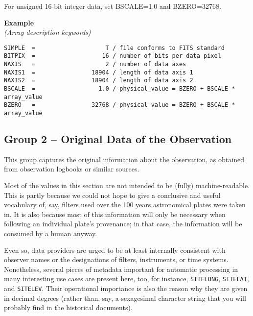 \documentclass[11pt]{ivoa}
\newcommand\cardname[1]{\texttt{\color{keyword}#1}}
\newenvironment{fitsexample}[1]
{\bigskip\noindent\textbf{Example}\\\textit{(#1)\smallskip}}
{\medskip}
\begin{document}
For unsigned 16-bit integer data, set BSCALE=1.0 and BZERO=32768.

\begin{fitsexample}{Array description keywords}
\begin{lstlisting}
SIMPLE  =                    T / file conforms to FITS standard
BITPIX  =                   16 / number of bits per data pixel
NAXIS   =                    2 / number of data axes
NAXIS1  =                18904 / length of data axis 1
NAXIS2  =                18904 / length of data axis 2
BSCALE  =                  1.0 / physical_value = BZERO + BSCALE * array_value
BZERO   =                32768 / physical_value = BZERO + BSCALE * array_value
\end{lstlisting}
\end{fitsexample}

\subsection{Group 2 -- Original Data of the Observation}

This group captures the original information about
the observation, as obtained from observation logbooks or similar
sources.

Most of the values in this section are not intended to be (fully)
machine-readable.  This is partly because we could not hope to give a
conclusive and useful vocabulary of, say, filters used over the 100 years
astronomical plates were taken in.  It is also because most of
this information will only be necessary when following an individual
plate's provenance; in that case, the information will be consumed by a
human anyway.

Even so, data providers are urged to be at least internally consistent
with observer names or the designations of filters, instruments, or time
systems.  Nonetheless, several pieces of metadata important for automatic
processing in many interesting use cases are present here, too, for
instance, \cardname{SITELONG}, \cardname{SITELAT}, and
\cardname{SITELEV}.  Their operational importance is also
the reason why they are given in decimal degrees (rather than, say, a
sexagesimal character string that you will probably find in the
historical documents).
\end{document}
